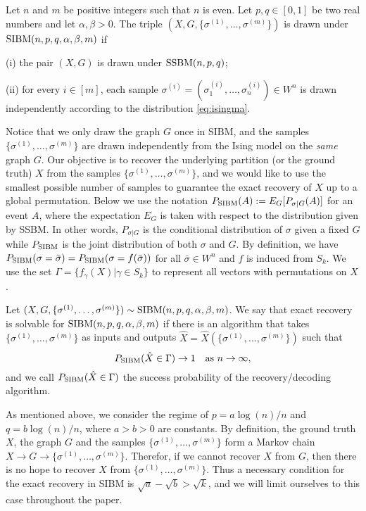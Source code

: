 \documentclass{article}
\begin{document}
\begin{definition}
Let $n$ and $m$ be positive integers such that $n$ is even. Let $p,q\in[0,1]$ be two real numbers and let $\alpha,\beta>0$. The triple $(X,G,\{\sigma^{(1)},\dots,\sigma^{(m)}\})$ is drawn under $\operatorname{SIBM}(n,p,q,\alpha,\beta,m)$ if

\noindent
(i) the pair $(X,G)$ is drawn under $\operatorname{SSBM}(n,p,q)$;

\noindent
(ii) for every $i\in[m]$, each sample $\sigma^{(i)}=(\sigma_1^{(i)},\dots,\sigma_n^{(i)}) \in W^n$ is drawn independently according to the distribution \eqref{eq:isingma}.
\end{definition}

Notice that we only draw the graph $G$ once in SIBM, and the samples $\{\sigma^{(1)},\dots,\sigma^{(m)}\}$ are drawn independently from the Ising model on the {\em same} graph $G$.
Our objective is to recover the underlying partition (or the ground truth) $X$ from the samples $\{\sigma^{(1)},\dots,\sigma^{(m)}\}$, and we would like to use the smallest possible number of samples to guarantee the exact recovery of $X$ up to a global permutation.
Below we use the notation $P_{\operatorname{SIBM}}(A):=E_G[P_{\sigma|G}(A)]$ for an event $A$, where the expectation $E_G$ is taken with respect to the distribution given by SSBM. In other words, $P_{\sigma|G}$ is the conditional distribution of  $\sigma$ given a fixed $G$ while $P_{\operatorname{SIBM}}$ is the joint distribution of both $\sigma$ and $G$.
By definition, we have $P_{\operatorname{SIBM}}(\sigma=\bar{\sigma})=P_{\operatorname{SIBM}}(\sigma=f(\bar{\sigma}))$ for all $\bar{\sigma}\in W^n$ and $f$ is induced from $S_k$. We use the set $\Gamma = \{f_{\gamma}(X) | \gamma \in S_k\}$ to
represent all vectors with permutations on $X$.

\begin{definition}
Let $(X,G,\{\sigma^{(1)},\dots,\sigma^{(m)}\}) \sim \operatorname{SIBM}(n,p,q,\alpha,\beta,m)$.
We say that exact recovery is solvable for $\operatorname{SIBM}(n,p,q,\alpha,\beta,m)$ if there is an algorithm that takes $\{\sigma^{(1)},\dots,\sigma^{(m)}\}$ as inputs and outputs $\hat{X}=\hat{X}(\{\sigma^{(1)},\dots,\sigma^{(m)}\})$ such that
$$
P_{\operatorname{SIBM}}(\hat{X} \in \Gamma) \to 1
\text{~~~as~} n\to\infty ,
$$
and we call $P_{\operatorname{SIBM}}(\hat{X} \in \Gamma)$ the success probability of the recovery/decoding algorithm.
\end{definition}


As mentioned above, we consider the regime of $p=a\log(n)/n$ and $q=b\log(n)/n$, where $a>b> 0$ are constants. By definition, the ground truth $X$, the graph $G$ and the samples $\{\sigma^{(1)},\dots,\sigma^{(m)}\}$ form a Markov chain $X\to G\to \{\sigma^{(1)},\dots,\sigma^{(m)}\}$. Therefor, if we cannot recover $X$ from $G$, then there is no hope to recover $X$ from $\{\sigma^{(1)},\dots,\sigma^{(m)}\}$. Thus a necessary condition for the exact recovery in SIBM is $\sqrt{a}-\sqrt{b}> \sqrt{k}$, and we will limit ourselves to this case throughout the paper.
\end{document}
